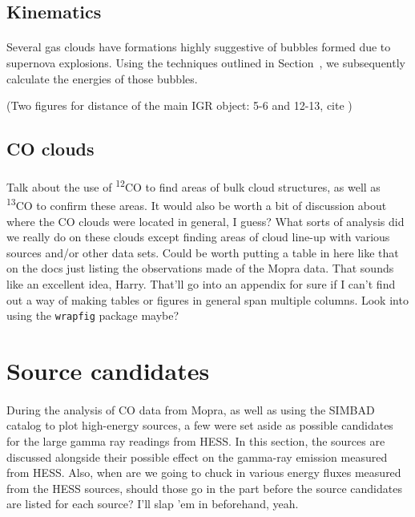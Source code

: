 \documentclass[a4paper, titlepage, oneside]{article}
\newcommand{\elem}[2]{\textsuperscript{#1}{#2}}
\begin{document}
\begin{multicols}{2}
\subsection{Kinematics}
\paragraph{}
Several gas clouds have formations highly suggestive of bubbles formed due to supernova explosions. Using the techniques outlined in Section~\label{sec:kinetic}, we subsequently calculate the energies of those bubbles.

(Two figures for distance of the main IGR object: 5-6 and 12-13, cite \parencite{Lutovinov:2005})

\subsection{CO clouds}
\paragraph{}
Talk about the use of \elem{12}{C}O to find areas of bulk cloud structures, as well as \elem{13}{C}O to confirm these areas. It would also be worth a bit of discussion about where the CO clouds were located in general, I guess? What sorts of analysis did we really do on these clouds except finding areas of cloud line-up with various sources and/or other data sets. Could be worth putting a table in here like that on the docs just listing the observations made of the Mopra data. That sounds like an excellent idea, Harry. That'll go into an appendix for sure if I can't find out a way of making tables or figures in general span multiple columns. Look into using the \texttt{wrapfig} package maybe?

\section{Source candidates}
\paragraph{}
During the analysis of CO data from Mopra, as well as using the SIMBAD catalog to plot high-energy sources, a few were set aside as possible candidates for the large gamma ray readings from HESS. In this section, the sources are discussed alongside their possible effect on the gamma-ray emission measured from HESS. Also, when are we going to chuck in various energy fluxes measured from the HESS sources, should those go in the part before the source candidates are listed for each source? I'll slap 'em in beforehand, yeah.


\end{multicols}
\end{document}
